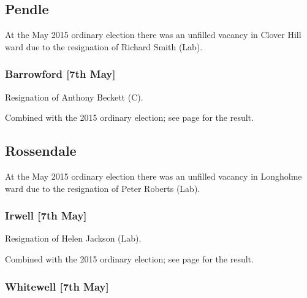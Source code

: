 \documentclass[a4paper,openany]{book}
\begin{document}
\begin{resultsiii}
\subsection*{Pendle}

At the May 2015 ordinary election there was an unfilled vacancy in Clover Hill ward due to the resignation of Richard Smith (Lab).

\subsubsection*{Barrowford \hspace*{\fill}\nolinebreak[1]%
\enspace\hspace*{\fill}
[7th May]}


Resignation of Anthony Beckett (C).

Combined with the 2015 ordinary election; see page \pageref{BarrowfordPendle} for the result.

\subsection*{Rossendale}

At the May 2015 ordinary election there was an unfilled vacancy in Longholme ward due to the resignation of Peter Roberts (Lab).

\subsubsection*{Irwell \hspace*{\fill}\nolinebreak[1]%
\enspace\hspace*{\fill}
[7th May]}


Resignation of Helen Jackson (Lab).

Combined with the 2015 ordinary election; see page \pageref{IrwellRossendale} for the result.

\subsubsection*{Whitewell \hspace*{\fill}\nolinebreak[1]%
\enspace\hspace*{\fill}
[7th May]}



\end{resultsiii}
\end{document}
